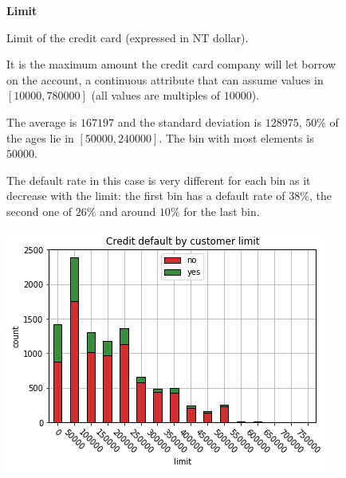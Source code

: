 \begin{figure}[h]
  \begin{minipage}[h]{.50\textwidth}
        {\Large \textbf{Limit}}
        
        Limit of the credit card (expressed in NT dollar).
        
        It is the maximum amount the credit card company will let borrow on the account, 
        a continuous attribute that can assume values in $[10000, 780000]$ (all values are multiples of $10000$).
        
        The average is $167197$ and the standard deviation is $128975$, $50\%$ of the ages lie in $[50000, 240000]$. The bin with most elements is $50000$.
        
        The default rate in this case is very different for each bin as it decrease with the limit: the first bin has a default rate of $38\%$, the second one of $26\%$ and around $10\%$ for the last bin.
        
  \end{minipage}
  \begin{minipage}[h]{.50\textwidth}
    \includegraphics[width=.95\textwidth]{img/ch2/limit}
  \end{minipage}

\end{figure}


